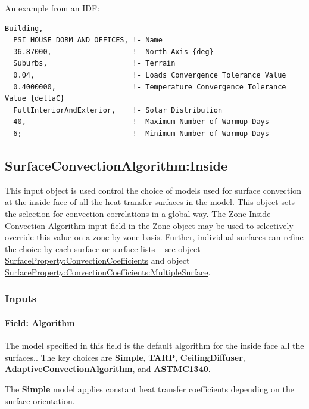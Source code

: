 An example from an IDF:

\begin{lstlisting}
Building,
  PSI HOUSE DORM AND OFFICES, !- Name
  36.87000,                   !- North Axis {deg}
  Suburbs,                    !- Terrain
  0.04,                       !- Loads Convergence Tolerance Value
  0.4000000,                  !- Temperature Convergence Tolerance Value {deltaC}
  FullInteriorAndExterior,    !- Solar Distribution
  40,                         !- Maximum Number of Warmup Days
  6;                          !- Minimum Number of Warmup Days
\end{lstlisting}

\subsection{SurfaceConvectionAlgorithm:Inside}\label{surfaceconvectionalgorithminside}

This input object is used control the choice of models used for surface convection at the inside face of all the heat transfer surfaces in the model. This object sets the selection for convection correlations in a global way. The Zone Inside Convection Algorithm input field in the Zone object may be used to selectively override this value on a zone-by-zone basis. Further, individual surfaces can refine the choice by each surface or surface lists -- see object \hyperref[surfacepropertyconvectioncoefficients]{SurfaceProperty:ConvectionCoefficients} and object \hyperref[surfacepropertyconvectioncoefficientsmultiplesurface]{SurfaceProperty:ConvectionCoefficients:MultipleSurface}.

\subsubsection{Inputs}\label{inputs-4-031}

\paragraph{Field: Algorithm}\label{field-algorithm-000}

The model specified in this field is the default algorithm for the inside face all the surfaces.. The key choices are \textbf{Simple}, \textbf{TARP}, \textbf{CeilingDiffuser}, \textbf{AdaptiveConvectionAlgorithm}, and \textbf{ASTMC1340}.

The \textbf{Simple} model applies constant heat transfer coefficients depending on the surface orientation.

